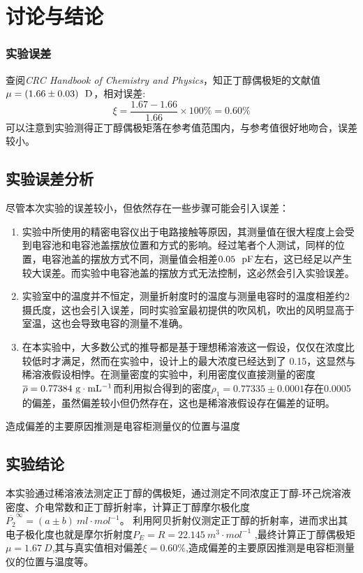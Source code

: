 \documentclass[12pt]{article}
\begin{document}
 	\section{讨论与结论}
		\subsubsection{实验误差}
		查阅\textit{CRC Handbook of Chemistry and Physics}\citealp{crc}，知正丁醇偶极矩的文献值$\mu=(1.66\pm 0.03)\ \ {\rm D}$，相对误差:
			$$
			\xi=\frac{1.67-1.66}{1.66}\times 100\%=0.60\%
			$$
		可以注意到实验测得正丁醇偶极矩落在参考值范围内，与参考值很好地吻合，误差较小。
		\subsection{实验误差分析}
		尽管本次实验的误差较小，但依然存在一些步骤可能会引入误差：
		\begin{enumerate}
			\item 实验中所使用的精密电容仪出于电路接触等原因，其测量值在很大程度上会受到电容池和电容池盖摆放位置和方式的影响。经过笔者个人测试，同样的位置，电容池盖的摆放方式不同，测量值会相差$0.05\ \ {\rm pF}$左右，这已经足以产生较大误差。而实验中电容池盖的摆放方式无法控制，这必然会引入实验误差。
			\item 实验室中的温度并不恒定，测量折射度时的温度与测量电容时的温度相差约2摄氏度，这也会引入误差，同时实验室最初提供的吹风机，吹出的风明显高于室温，这也会导致电容的测量不准确。
			\item 在本实验中，大多数公式的推导都是基于理想稀溶液这一假设，仅仅在浓度比较低时才满足，然而在实验中，设计上的最大浓度已经达到了 0.15，这显然与稀溶液假设相悖。在测量密度的实验中，利用密度仪直接测量的密度$\overline{\rho}=0.77384\ {\rm g\cdot mL^{-1}}$而利用拟合得到的密度$\rho_{1}=0.77335\pm 0.0001$存在0.0005的偏差，虽然偏差较小但仍然存在，这也是稀溶液假设存在偏差的证明。
		\end{enumerate} \par
		造成偏差的主要原因推测是电容柜测量仪的位置与温度
 	 
 		\subsection{实验结论}
		 本实验通过稀溶液法测定正丁醇的偶极矩，通过测定不同浓度正丁醇-环己烷溶液密度、介电常数和正丁醇折射率，计算正丁醇摩尔极化度$\overline{P_{2}}^{\infty }=(a\pm b) \ ml\cdot mol^{-1} $。
		 利用阿贝折射仪测定正丁醇的折射率，进而求出其电子极化度也就是摩尔折射度$P_{E}=R=22.145 \ m^{3}\cdot mol^{-1}$ ,最终计算正丁醇偶极矩$\mu =1.67 \ D$,其与真实值相对偏差$\xi =0.60 \% $,造成偏差的主要原因推测是电容柜测量仪的位置与温度等。

\vbox{}  


\end{document}

